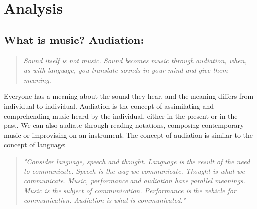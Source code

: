 \chapter{Analysis}\label{chap:analysis}
\section{What is music? Audiation:} 
\begin{quote}
	\textit{Sound itself is not music. Sound becomes music through audiation, when, as with language, you translate sounds in your mind and give them meaning.} \cite{audiation}\\
\end{quote}

Everyone has a meaning about the sound they hear, and the meaning differs from individual to individual.\cite{audiation} Audiation is the concept of assimilating and comprehending music heard by the individual, either in the present or in the past. We can also audiate through reading notations, composing contemporary music or improvising on an instrument.
The concept of audiation is similar to the concept of language\cite{audiation}: \\

\begin{quote}
	\textit{"Consider language, speech and thought. Language is the result of the need to communicate. Speech is the way we communicate. Thought is what we communicate. Music, performance and audiation have parallel meanings. Music is the subject of communication. Performance is the vehicle for communication. Audiation is what is communicated."} \cite{audiation}\\
\end{quote}

